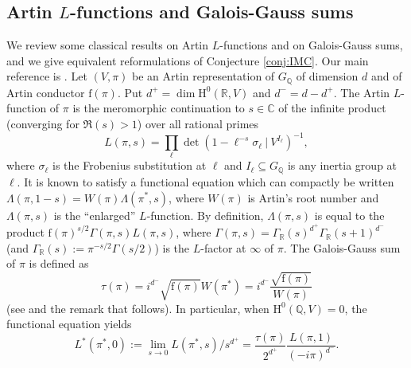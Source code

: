 \documentclass[12pt]{amsart}
\newcommand\bR{\mathbb{R}}
\newcommand\bC{\mathbb{C}}
\newcommand\bQ{\mathbb{Q}}
\newcommand{\HH}{\mathrm{H}}
\newcommand{\ff}{\mathrm{f}}
\theoremstyle{defstyle}
\theoremstyle{thmstyle}
\begin{document}
\subsection{Artin $L$-functions and Galois-Gauss sums}\label{sec:Galois_Gauss}
We review some classical results on Artin $L$-functions and on Galois-Gauss sums, and we give equivalent reformulations of Conjecture \ref{conj:IMC}. Our main reference is \cite{martinet}. Let $(V,\pi)$ be an Artin representation of $G_{\bQ}$ of dimension $d$ and of Artin conductor $\ff(\pi)$. Put $d^+=\dim\HH^0(\bR,V)$ and $d^-=d-d^+$. The Artin $L$-function of $\pi$ is the meromorphic continuation to $s\in\bC$ of the infinite product (converging for $\Re(s)>1$) over all rational primes
$$L(\pi,s)= \prod_{\ell} \det(1-\ell^{-s}\sigma_\ell \ \big|\ V^{I_\ell})^{-1},$$
where $\sigma_\ell$ is the Frobenius substitution at $\ell$ and  $I_\ell\subseteq G_{\bQ}$ is any inertia group at $\ell$. It is known to satisfy a functional equation which can compactly be written $\Lambda(\pi,1-s)=W(\pi)\Lambda(\pi^*,s)$, where $W(\pi)$ is Artin's root number and $\Lambda(\pi,s)$ is the ``enlarged'' $L$-function. By definition, $\Lambda(\pi,s)$ is equal to the product $\ff(\pi)^{s/2}\Gamma(\pi,s)L(\pi,s)$, where $\Gamma(\pi,s)=\Gamma_\bR(s)^{d^+}\Gamma_\bR(s+1)^{d^-}$ (and $\Gamma_\bR(s):=\pi^{-s/2}\Gamma(s/2)$) is the $L$-factor at $\infty$ of $\pi$. The Galois-Gauss sum of $\pi$ is defined as
$$\tau(\pi)=i^{d^-}\sqrt{\ff(\pi)}W(\pi^*)=i^{d^-}\dfrac{\sqrt{\ff(\pi)}}{W(\pi)}$$
(see \cite[Chapter II, Definition 7.2]{martinet} and the remark that follows). In particular, when $\HH^0(\bQ,V)=0$, the functional equation yields
\begin{equation}\label{eq:eval_equation_fonctionnelle}
L^*(\pi^*,0):=\lim_{s\rightarrow 0}L(\pi^*,s)/s^{d^+}=\frac{\tau(\pi)}{2^{d^+}}\dfrac{L(\pi,1)}{(-i\pi)^{d^-}}.
\end{equation}
\end{document}
